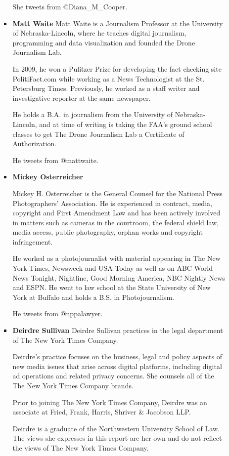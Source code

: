 \begin{itemize}
\begin{itemized}
\begin{itemize}
\begin{itemize}
She tweets from @Diana_M_Cooper.

\item \textbf{Matt Waite}
Matt Waite is a Journalism Professor at the University of Nebraska-Lincoln,
where he teaches digital journalism, programming and data visualization
and founded the Drone Journalism Lab.

In 2009, he won a Pulitzer Prize for developing the fact checking site
PolitiFact.com while working as a News Technologist at the St. Petersburg
Times. Previously, he worked as a staff writer and investigative reporter at
the same newspaper.

He holds a B.A. in journalism from the University of Nebraska-Lincoln, and
at time of writing is taking the FAA's ground school classes to get The Drone
Journalism Lab a Certificate of Authorization.

He tweets from @mattwaite.

\item \textbf{Mickey Osterreicher}

Mickey H. Osterreicher is the General Counsel for the National Press Photographers'
Association. He is experienced in contract, media, copyright
and First Amendment Law and has been actively involved in matters such
as cameras in the courtroom, the federal shield law, media access, public
photography, orphan works and copyright infringement.

He worked as a photojournalist with material appearing in The New York
Times, Newsweek and USA Today as well as on ABC World News Tonight,
Nightline, Good Morning America, NBC Nightly News and ESPN.
He went to law school at the State University of New York at Buffalo and
holds a B.S. in Photojournalism.

He tweets from @nppalawyer.


\item \textbf{Deirdre Sullivan}
Deirdre Sullivan practices in the legal department of The New York
Times Company.

Deirdre's practice focuses on the business, legal and policy aspects of new
media issues that arise across digital platforms, including digital ad operations
and related privacy concerns. She counsels all of the The New York
Times Company brands.

Prior to joining The New York Times Company, Deirdre was an associate at
Fried, Frank, Harris, Shriver & Jacobson LLP.

Deirdre is a graduate of the Northwestern University School of Law.
The views she expresses in this report are her own and do not reflect the
views of The New York Times Company.


\end{itemize}
\end{itemize}
\end{itemized}
\end{itemize}
